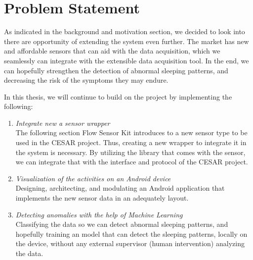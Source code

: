 \section{Problem Statement}

As indicated in the background and motivation section, we decided to look into there are opportunity of extending the system even further. The market has new and affordable sensors that can aid with the data acquisition, which we seamlessly can integrate with the extensible data acquisition tool. In the end, we can hopefully strengthen the detection of abnormal sleeping patterns, and decreasing the risk of the symptoms they may endure.

In this thesis, we will continue to build on the project by implementing the following:

\begin{enumerate}
    \item \textit{Integrate new a sensor wrapper}\\The following section Flow Sensor Kit introduces to a new sensor type to be used in the CESAR project. Thus, creating a new wrapper to integrate it in the system is necessary. By utilizing the library that comes with the sensor, we can integrate that with the interface and protocol of the CESAR project.
    \item \textit{Visualization of the activities on an Android device}\\Designing, architecting, and modulating an Android application that implements the new sensor data in an adequately layout.
    \item \textit{Detecting anomalies with the help of Machine Learning}\\Classifying the data so we can detect abnormal sleeping patterns, and hopefully training an model that can detect the sleeping patterns, locally on the device, without any external supervisor (human intervention) analyzing the data. 
\end{enumerate}

